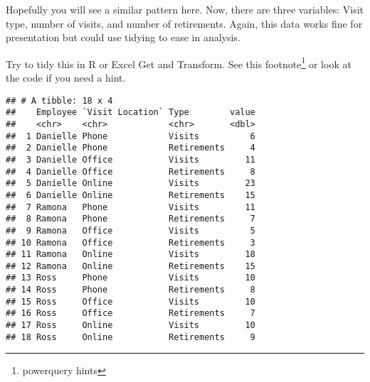 \documentclass[]{book}
\newenvironment{Shaded}{\begin{snugshade}}{\end{snugshade}}
\newcommand{\KeywordTok}[1]{\textcolor[rgb]{0.13,0.29,0.53}{\textbf{#1}}}
\newcommand{\DataTypeTok}[1]{\textcolor[rgb]{0.13,0.29,0.53}{#1}}
\newcommand{\StringTok}[1]{\textcolor[rgb]{0.31,0.60,0.02}{#1}}
\newcommand{\OtherTok}[1]{\textcolor[rgb]{0.56,0.35,0.01}{#1}}
\newcommand{\OperatorTok}[1]{\textcolor[rgb]{0.81,0.36,0.00}{\textbf{#1}}}
\newcommand{\NormalTok}[1]{#1}
\begin{document}
Hopefully you will see a similar pattern here. Now, there are three
variables: Visit type, number of visits, and number of retirements.
Again, this data works fine for presentation but could use tidying to
ease in analysis.

\begin{Shaded}
\end{Shaded}

\hypertarget{htmlwidget-f2426f646a335847044c}{}

Try to tidy this in R or Excel Get and Transform. See this
footnote\footnote{powerquery hints} or look at the code if you need a
hint.

\begin{Shaded}
\end{Shaded}

\begin{verbatim}
## # A tibble: 18 x 4
##    Employee `Visit Location` Type        value
##    <chr>    <chr>            <chr>       <dbl>
##  1 Danielle Phone            Visits          6
##  2 Danielle Phone            Retirements     4
##  3 Danielle Office           Visits         11
##  4 Danielle Office           Retirements     8
##  5 Danielle Online           Visits         23
##  6 Danielle Online           Retirements    15
##  7 Ramona   Phone            Visits         11
##  8 Ramona   Phone            Retirements     7
##  9 Ramona   Office           Visits          5
## 10 Ramona   Office           Retirements     3
## 11 Ramona   Online           Visits         18
## 12 Ramona   Online           Retirements    15
## 13 Ross     Phone            Visits         10
## 14 Ross     Phone            Retirements     8
## 15 Ross     Office           Visits         10
## 16 Ross     Office           Retirements     7
## 17 Ross     Online           Visits         10
## 18 Ross     Online           Retirements     9
\end{verbatim}
\end{document}
